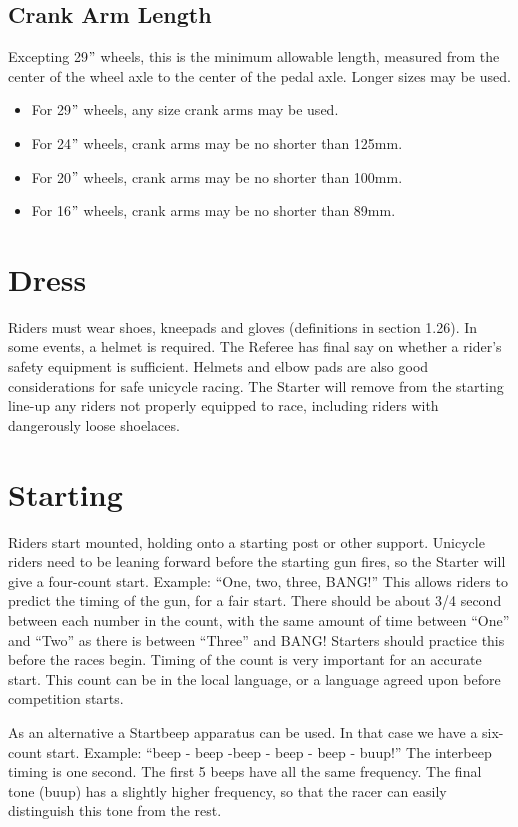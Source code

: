 \subsection{Crank Arm Length}
Excepting 29$"$ wheels, this is the minimum allowable length, measured from the center of the wheel axle to the center of the pedal axle.
Longer sizes may be used.
\begin{itemize}
\item For 29$"$ wheels, any size crank arms may be used.
\item For 24$"$ wheels, crank arms may be no shorter than 125mm.
\item For 20$"$ wheels, crank arms may be no shorter than 100mm.
\item For 16$"$ wheels, crank arms may be no shorter than 89mm.
\end{itemize}

\section{Dress}
Riders must wear shoes, kneepads and gloves (definitions in section 1.26). %
In some events, a helmet is required.
The Referee has final say on whether a rider’s safety equipment is sufficient.
Helmets and elbow pads are also good considerations for safe unicycle racing.
The Starter will remove from the starting line-up any riders not properly equipped to race, including riders with dangerously loose shoelaces.

\section{Starting}
Riders start mounted, holding onto a starting post or other support.
Unicycle riders need to be leaning forward before the starting gun fires, so the Starter will give a four-count start.
Example: ``One, two, three, BANG!'' This allows riders to predict the timing of the gun, for a fair start.
There should be about 3/4 second between each number in the count, with the same amount of time between ``One'' and ``Two'' as there is between ``Three'' and BANG! Starters should practice this before the races begin.
Timing of the count is very important for an accurate start.
This count can be in the local language, or a language agreed upon before competition starts.

As an alternative a Startbeep apparatus can be used.
In that case we have a six-count start.
Example: ``beep - beep -beep - beep - beep - buup!'' The interbeep timing is one second.
The first 5 beeps have all the same frequency.
The final tone (buup) has a slightly higher frequency, so that the racer can easily distinguish this tone from the rest.

